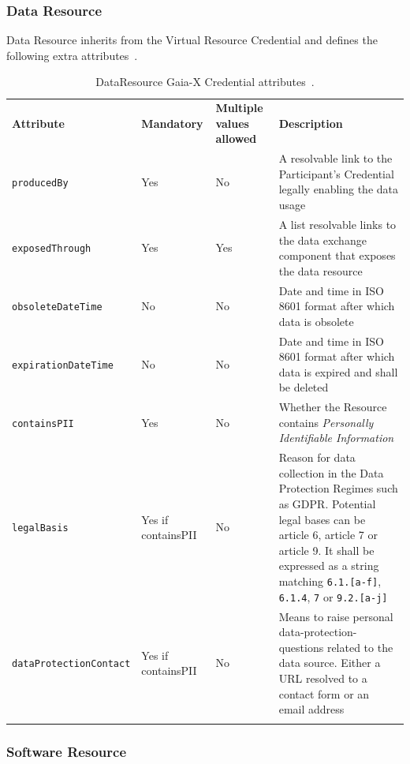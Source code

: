 \subsubsection{Data Resource}

Data Resource inherits from the Virtual Resource Credential and defines the following extra attributes~\cite{gaiax_trust_framework}.

\begin{longtable}{ |p{4cm}|p{2cm}|p{2cm}|p{7cm}| }
    \hhline{----}
    \textbf{Attribute} & \textbf{Mandatory} & \textbf{Multiple values allowed} & \textbf{Description}\\
    \hhline{----}
    \texttt{producedBy} & Yes & No & A resolvable link to the Participant's Credential legally enabling the data usage\\
    \hhline{----}
    \texttt{exposedThrough} & Yes & Yes & A list resolvable links to the data exchange component that exposes the data resource\\
    \hhline{----}
    \texttt{obsoleteDateTime} & No & No & Date and time in ISO 8601 format after which data is obsolete\\
    \hhline{----}
    \texttt{expirationDateTime} & No & No & Date and time in ISO 8601 format after which data is expired and shall be deleted\\
    \hhline{----}
    \texttt{containsPII} & Yes & No & Whether the Resource contains \textit{Personally Identifiable Information}\\
    \hhline{----}
    \texttt{legalBasis} & Yes if containsPII & No & Reason for data collection in the Data Protection Regimes such as GDPR. Potential legal bases can be article 6, article 7 or article 9.
    It shall be expressed as a string matching \texttt{6.1.[a-f]}, \texttt{6.1.4}, \texttt{7} or \texttt{9.2.[a-j]}\\
    \texttt{dataProtectionContact} & Yes if containsPII & No & Means to raise personal data-protection-questions related to the data source.
    Either a URL resolved to a contact form or an email address\\
    \hhline{----}
    \caption{DataResource Gaia-X Credential attributes~\cite{gaiax_trust_framework}.}
    \label{tab:data_resource}
\end{longtable}

\subsubsection{Software Resource}


